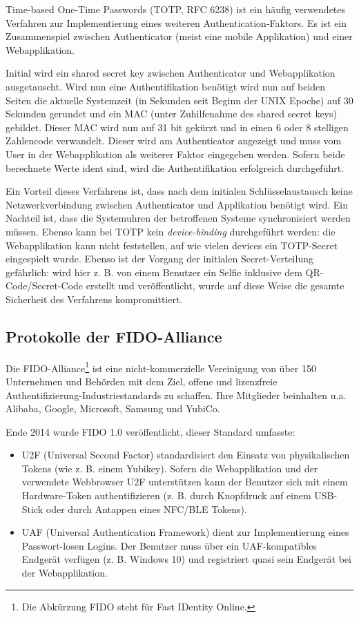 Time-based One-Time Passwords (TOTP, RFC 6238) ist ein häufig verwendetes Verfahren zur Implementierung eines weiteren Authentication-Faktors. Es ist ein Zusammenspiel zwischen Authenticator (meist eine mobile Applikation) und einer Webapplikation.

Initial wird ein shared secret key zwischen Authenticator und Webapplikation ausgetauscht. Wird nun eine Authentifikation benötigt wird nun auf beiden Seiten die aktuelle Systemzeit (in Sekunden seit Beginn der UNIX Epoche) auf 30 Sekunden gerundet und ein MAC (unter Zuhilfenahme des shared secret keys) gebildet. Dieser MAC wird nun auf 31 bit gekürzt und in einen 6 oder 8 stelligen Zahlencode verwandelt. Dieser wird am Authenticator angezeigt und muss vom User in der Webapplikation als weiterer Faktor eingegeben werden. Sofern beide berechnete Werte ident sind, wird die Authentifikation erfolgreich durchgeführt.

Ein Vorteil dieses Verfahrens ist, dass nach dem initialen Schlüsselaustausch keine Netzwerkverbindung zwischen Authenticator und Applikation benötigt wird. Ein Nachteil ist, dass die Systemuhren der betroffenen Systeme synchronisiert werden müssen. Ebenso kann bei TOTP kein \textit{device-binding} durchgeführt werden: die Webapplikation kann nicht feststellen, auf wie vielen devices ein TOTP-Secret eingespielt wurde. Ebenso ist der Vorgang der initialen Secret-Verteilung gefährlich: wird hier z. B. von einem Benutzer ein Selfie inklusive dem QR-Code/Secret-Code erstellt und veröffentlicht, wurde auf diese Weise die gesamte Sicherheit des Verfahrens kompromittiert.

\subsection{Protokolle der FIDO-Alliance}

Die FIDO-Alliance\footnote{Die Abkürzung FIDO steht für Fast IDentity Online.} ist eine nicht-kommerzielle Vereinigung von über 150 Unternehmen und Behörden mit dem Ziel, offene und lizenzfreie Authentifizierung-Industriestandards zu schaffen. Ihre Mitglieder beinhalten u.a. Alibaba, Google, Microsoft, Samsung und YubiCo.

Ende 2014 wurde FIDO 1.0 veröffentlicht, dieser Standard umfasste:

\begin{itemize}
	\item U2F (Universal Second Factor) standardisiert den Einsatz von physikalischen Tokens (wie z. B. einem Yubikey). Sofern die Webapplikation und der verwendete Webbrowser U2F unterstützen kann der Benutzer sich mit einem Hardware-Token authentifizieren (z. B. durch Knopfdruck auf einem USB-Stick oder durch Antappen eines NFC/BLE Tokens).
	\item UAF (Universal Authentication Framework) dient zur Implementierung eines Passwort-losen Logins. Der Benutzer muss über ein UAF-kompatibles Endgerät verfügen (z. B. Windows 10) und registriert quasi sein Endgerät bei der Webapplikation.
\end{itemize}

